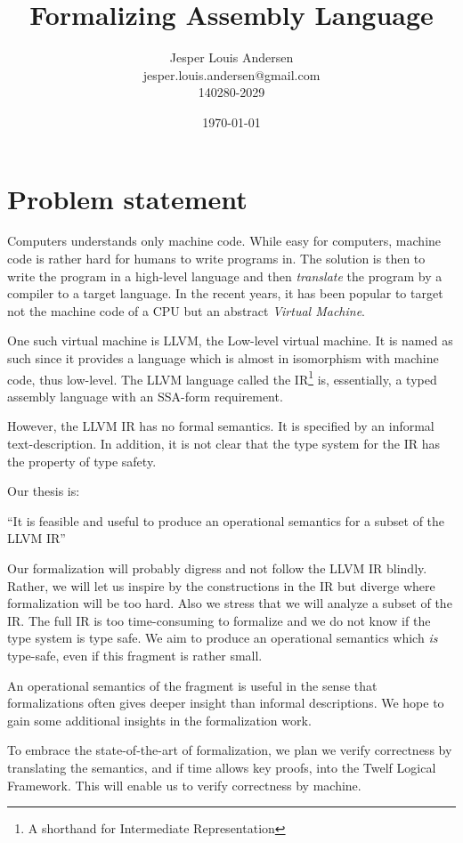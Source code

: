 \documentclass[a4paper, oneside, 10pt, draft]{memoir}
\author{Jesper Louis
  Andersen\\jesper.louis.andersen@gmail.com\\140280-2029}
\title{Formalizing Assembly Language}
\date{\today}
\begin{document}
\maketitle{}
\chapter*{Problem statement}

Computers understands only machine code. While easy for computers,
machine code is rather hard for humans to write programs in. The
solution is then to write the program in a high-level language and
then \emph{translate} the program by a compiler to a target
language. In the recent years, it has been popular to target not the
machine code of a CPU but an abstract \emph{Virtual Machine}.

One such virtual machine is LLVM, the Low-level virtual machine. It is
named as such since it provides a language which is almost in
isomorphism with machine code, thus low-level. The LLVM language
called the IR\footnote{A shorthand for Intermediate Representation}
is, essentially, a typed assembly language with an
SSA-form\cite{appel:modern} requirement.

However, the LLVM IR has no formal semantics. It is specified by an
informal text-description. In addition, it is not clear that the type
system for the IR has the property of type safety\cite{pierce:types}.

Our thesis is:

``It is feasible and useful to produce an operational semantics for a
subset of the LLVM IR''

Our formalization will probably digress and not follow the LLVM IR
blindly. Rather, we will let us inspire by the constructions in the IR
but diverge where formalization will be too hard. Also we stress that
we will analyze a subset of the IR. The full IR is too time-consuming
to formalize and we do not know if the type system is type safe. We
aim to produce an operational semantics which \emph{is} type-safe,
even if this fragment is rather small.

An operational semantics of the fragment is useful in the sense that
formalizations often gives deeper insight than informal
descriptions. We hope to gain some additional insights in the
formalization work.

To embrace the state-of-the-art of formalization, we plan we verify
correctness by translating the semantics, and if time allows key
proofs, into the Twelf Logical Framework. This will enable us to
verify correctness by machine.
\end{document}
